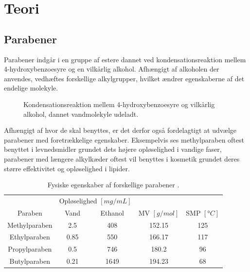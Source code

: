 \section{Teori}
    \subsection{Parabener}
    Parabener indgår i en gruppe af estere dannet ved kondensationsreaktion mellem 4-hydroxybenzoesyre og en vilkårlig alkohol. Afhængigt af alkoholen der anvendes, vedhæftes forskellige alkylgrupper, hvilket ændrer egenskaberne af det endelige molekyle.
    \begin{figure}[H]
        \caption{Kondensationsreaktion mellem 4-hydroxybenzoesyre og vilkårlig alkohol, dannet vandmolekyle udeladt.}
    \end{figure}
    Afhængigt af hvor de skal benyttes, er det derfor også fordelagtigt at udvælge parabener med foretrækkelige egenskaber. Eksempelvis ses methylparaben oftest benyttet i levnedsmidler grundet dets højere opløselighed i vandige faser, parabener med længere alkylkæder oftest vil benyttes i kosmetik grundet deres større effektivitet og opløselighed i lipider.
    \begin{table}[H]\centering
        \caption{Fysiske egenskaber af forskellige parabener \parencite{PubChem}.}
        \begin{tabular}{ccccc}
            \toprule
            & \multicolumn{2}{c}{Opløselighed $\left[\si{mg\per mL}\right]$} & & \\
            \cmidrule(r){2-3}
            Paraben & Vand & Ethanol & MV $\left[\si{g\per mol}\right]$ & SMP $\left[\si{\degree C}\right]$ \\
            \midrule
            Methylparaben & 2.5 & 408 & 152.15 & 125 \\
            Ethylparaben & 0.85 & 550 & 166.17 & 117 \\ 
            Propylparaben & 0.5 & 746 & 180.2 & 96 \\
            Butylparaben & 0.21 & 1649 & 194.23 & 68 \\
            \bottomrule
        \end{tabular}
    \end{table}

